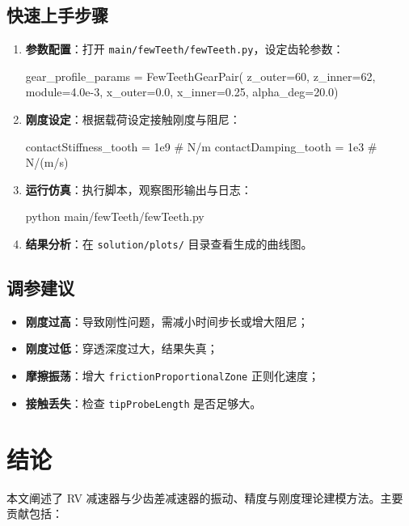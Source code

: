 \documentclass[12pt]{ctexart}
\begin{document}
\subsection{快速上手步骤}

\begin{enumerate}
  \item \textbf{参数配置}：打开 \texttt{main/fewTeeth/fewTeeth.py}，设定齿轮参数：
  \begin{pythoncode}
gear_profile_params = FewTeethGearPair(
    z_outer=60, z_inner=62, module=4.0e-3,
    x_outer=0.0, x_inner=0.25, alpha_deg=20.0)
  \end{pythoncode}
  
  \item \textbf{刚度设定}：根据载荷设定接触刚度与阻尼：
  \begin{pythoncode}
contactStiffness_tooth = 1e9  # N/m
contactDamping_tooth = 1e3    # N/(m/s)
  \end{pythoncode}
  
  \item \textbf{运行仿真}：执行脚本，观察图形输出与日志：
  \begin{pythoncode}
python main/fewTeeth/fewTeeth.py
  \end{pythoncode}
  
  \item \textbf{结果分析}：在 \texttt{solution/plots/} 目录查看生成的曲线图。
\end{enumerate}

\subsection{调参建议}

\begin{itemize}
  \item \textbf{刚度过高}：导致刚性问题，需减小时间步长或增大阻尼；
  \item \textbf{刚度过低}：穿透深度过大，结果失真；
  \item \textbf{摩擦振荡}：增大 \verb|frictionProportionalZone| 正则化速度；
  \item \textbf{接触丢失}：检查 \verb|tipProbeLength| 是否足够大。
\end{itemize}

\section{结论}

本文阐述了 RV 减速器与少齿差减速器的振动、精度与刚度理论建模方法。主要贡献包括：
\end{document}
